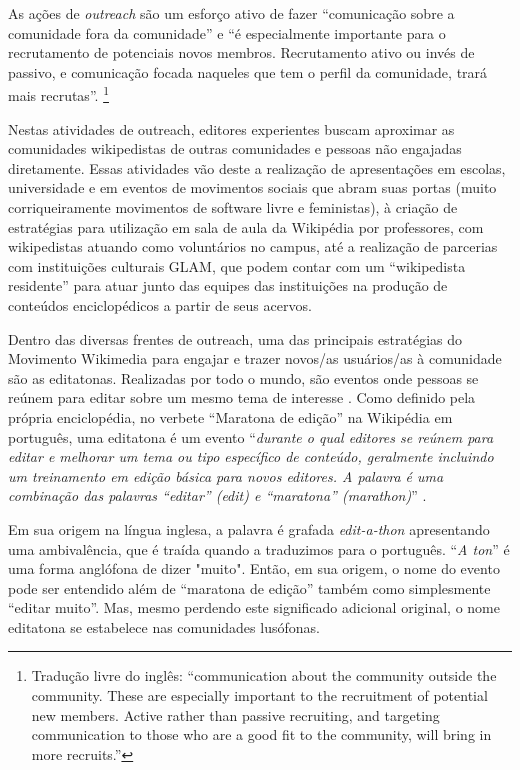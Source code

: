 As ações de \textit{outreach} são um esforço ativo de fazer ``comunicação sobre a comunidade fora da comunidade'' e ``é especialmente importante para o recrutamento de potenciais novos membros. Recrutamento ativo ou invés de passivo, e comunicação focada naqueles que tem o perfil da comunidade, trará mais recrutas''\citep[p.37/38]{kraut_dealing_2010}. \footnote{Tradução livre do inglês: ``communication about the community outside the community. These are especially important to the recruitment of potential new members. Active rather than passive recruiting, and targeting communication to those who are a good fit to the community, will bring in more recruits.''}

Nestas atividades de outreach, editores experientes buscam aproximar as comunidades wikipedistas de outras comunidades e pessoas não engajadas diretamente. Essas atividades vão deste a realização de apresentações em escolas, universidade e em eventos de movimentos sociais que abram suas portas (muito corriqueiramente movimentos de software livre e feministas\citep{farzan_bring_2016}), à criação de estratégias para utilização em sala de aula da Wikipédia por professores, com wikipedistas atuando como voluntários no campus, \citep{marques_trabalhando_2012} até a realização de parcerias com instituições culturais GLAM, que podem contar com um ``wikipedista residente'' para atuar junto das equipes das instituições na produção de conteúdos enciclopédicos a partir de seus acervos. \citep{stinson_stepping_2018}

Dentro das diversas frentes de outreach, uma das principais estratégias do Movimento Wikimedia para engajar e trazer novos/as usuários/as à comunidade são as editatonas. Realizadas por todo o mundo, são eventos onde pessoas se reúnem para editar sobre um mesmo tema de interesse \citep{littlejohn_learning_2019}. Como definido pela própria enciclopédia, no verbete ``Maratona de edição'' na Wikipédia em português, uma editatona é um evento ``\textit{durante o qual editores se reúnem para editar e melhorar um tema ou tipo específico de conteúdo, geralmente incluindo um treinamento em edição básica para novos editores. A palavra é uma combinação das palavras ``editar'' (\textit{edit}) e ``maratona'' (\textit{marathon})}'' .

Em sua origem na língua inglesa, a palavra é grafada \textit{edit-a-thon} apresentando uma ambivalência, que é traída quando a traduzimos para o português. ``\textit{A ton}'' é uma forma anglófona de dizer "muito". Então, em sua origem, o nome do evento pode ser entendido além de ``maratona de edição'' também como simplesmente ``editar muito''. Mas, mesmo perdendo este significado adicional original, o nome editatona se estabelece nas comunidades lusófonas.

